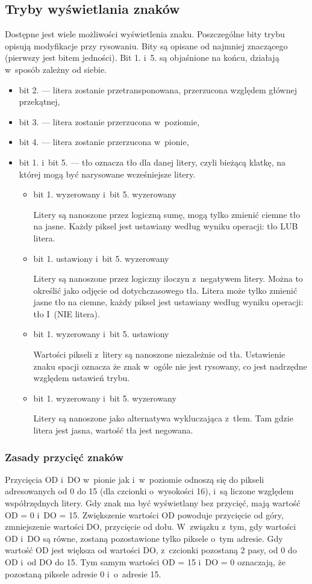 \subsection*{Tryby wyświetlania znaków}
Dostępne jest wiele możliwości wyświetlenia znaku. Poszczególne bity trybu opisują modyfikacje przy rysowaniu. Bity są opisane od najmniej znaczącego (pierwszy jest bitem jedności). Bit 1. i~5. są objaśnione na końcu, działają w~sposób zależny od siebie.
\begin{itemize}
\item bit 2. --- litera zostanie przetransponowana, przerzucona względem głównej przekątnej,
\item bit 3. --- litera zostanie przerzucona w~poziomie,
\item bit 4. --- litera zostanie przerzucona w~pionie,
\item bit 1. i~bit 5. --- tło oznacza tło dla danej litery, czyli bieżącą klatkę, na której mogą być narysowane wcześniejsze litery.
\begin{itemize}
\item bit 1. wyzerowany i~bit 5. wyzerowany

Litery są nanoszone przez logiczną sumę, mogą tylko zmienić ciemne tło na jasne. Każdy piksel jest ustawiany według wyniku operacji: tło LUB litera.
\item bit 1. ustawiony i~bit 5. wyzerowany

Litery są nanoszone przez logiczny iloczyn z~negatywem litery. Można to określić jako odjęcie od dotychczasowego tła. Litera może tylko zmienić jasne tło na ciemne, każdy piksel jest ustawiany według wyniku operacji: tło I~(NIE litera).
\item bit 1. wyzerowany i~bit 5. ustawiony

Wartości pikseli z~litery są nanoszone niezależnie od tła. Ustawienie znaku spacji oznacza że znak w~ogóle nie jest rysowany, co jest nadrzędne względem ustawień trybu.
\item bit 1. wyzerowany i~bit 5. wyzerowany

Litery są nanoszone jako alternatywa wykluczająca z~tłem. Tam gdzie litera jest jasna, wartość tła jest negowana.
\end{itemize}
\end{itemize}

\subsubsection*{Zasady przycięć znaków}
Przycięcia OD i~DO w~pionie jak i~w~poziomie odnoszą się do pikseli adresowanych od 0 do 15 (dla czcionki o~wysokości 16), i~są liczone względem współrzędnych litery. Gdy znak ma być wyświetlany bez przycięć, mają wartość OD = 0 i~DO = 15. Zwiększenie wartości OD powoduje przycięcie od góry, zmniejszenie wartości DO, przycięcie od dołu. W~związku z~tym, gdy wartości OD i~DO są równe, zostaną pozostawione tylko piksele o~tym adresie. Gdy wartość OD jest większa od wartości DO, z~czcionki pozostaną 2 pasy, od 0 do OD i~od DO do 15. Tym samym wartości  OD = 15 i~DO = 0 oznaczają, że pozostaną piksele adresie 0 i~o~adresie 15.

